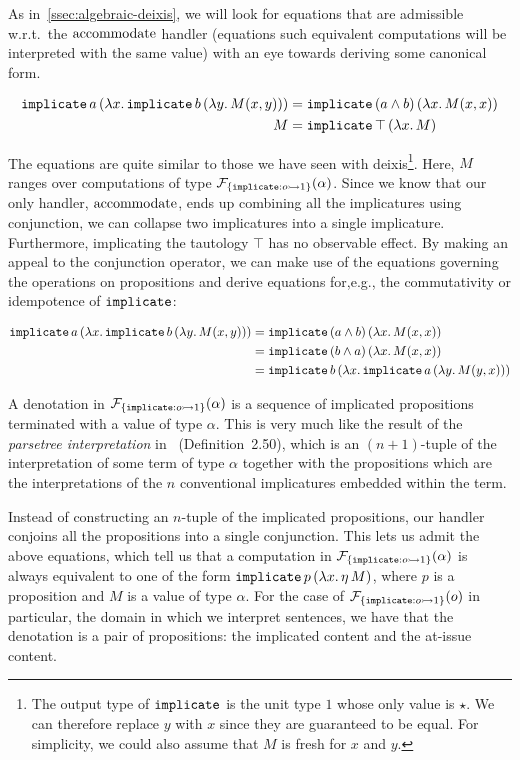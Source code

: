 As in~\ref{ssec:algebraic-deixis}, we will look for equations that are
admissible w.r.t.\ the $\operatorname{accommodate}$ handler (equations such equivalent
computations will be interpreted with the same value) with an eye towards
deriving some canonical form.

\begin{align*}
  \mathtt{implicate}\,a\,(\lambda x.\, \mathtt{implicate}\,b\,(\lambda y.\, M(x,y)))
  &= \mathtt{implicate}\,(a \land b)\,(\lambda x.\, M(x,x)) \\
  M &= \mathtt{implicate}\,\top\,(\lambda x.\, M)
\end{align*}

The equations are quite similar to those we have seen with
deixis\footnote{The output type of $\mathtt{implicate}$ is the unit type $1$
  whose only value is $\star$. We can therefore replace $y$ with $x$ since
  they are guaranteed to be equal. For simplicity, we could also assume
  that $M$ is fresh for $x$ and $y$.}. Here, $M$ ranges over computations
of type $\mathcal{F}_{\{ \mathtt{implicate} : o \rightarrowtail 1 \}}(\alpha)$. Since we know that
our only handler, $\operatorname{accommodate}$, ends up combining all the implicatures
using conjunction, we can collapse two implicatures into a single
implicature. Furthermore, implicating the tautology $\top$ has no
observable effect. By making an appeal to the conjunction operator, we can
make use of the equations governing the operations on propositions and
derive equations for,e.g., the commutativity or idempotence of
$\mathtt{implicate}$:

\begin{align*}
  \mathtt{implicate}\,a\,(\lambda x.\, \mathtt{implicate}\,b\,(\lambda y.\, M(x,y)))
  &= \mathtt{implicate}\,(a \land b)\,(\lambda x.\, M(x,x)) \\
  &= \mathtt{implicate}\,(b \land a)\,(\lambda x.\, M(x,x)) \\
  &= \mathtt{implicate}\,b\,(\lambda x.\, \mathtt{implicate}\,a\,(\lambda y.\, M(y,x)))
\end{align*}

A denotation in $\mathcal{F}_{\{ \mathtt{implicate} : o \rightarrowtail 1 \}}(\alpha)$ is a
sequence of implicated propositions terminated with a value of type
$\alpha$. This is very much like the result of the \emph{parsetree
  interpretation} in~\cite{potts2005logic} (Definition~2.50), which is an
$(n+1)$-tuple of the interpretation of some term of type $\alpha$ together
with the propositions which are the interpretations of the $n$ conventional
implicatures embedded within the term.

Instead of constructing an $n$-tuple of the implicated propositions, our
handler conjoins all the propositions into a single conjunction. This lets
us admit the above equations, which tell us that a computation in
$\mathcal{F}_{\{ \mathtt{implicate} : o \rightarrowtail 1 \}}(\alpha)$ is always equivalent to one
of the form $\mathtt{implicate}\,p\,(\lambda x.\, \eta\,M)$, where $p$ is a
proposition and $M$ is a value of type $\alpha$. For the case of
$\mathcal{F}_{\{ \mathtt{implicate} : o \rightarrowtail 1 \}}(o)$ in particular, the domain in
which we interpret sentences, we have that the denotation is a pair of
propositions: the implicated content and the at-issue content.


